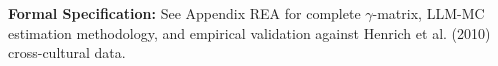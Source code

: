 \begin{cross-reference}
\textbf{Formal Specification:} See Appendix REA for complete $\gamma$-matrix, 
LLM-MC estimation methodology, and empirical validation against 
Henrich et al. (2010) cross-cultural data.
\end{cross-reference}

